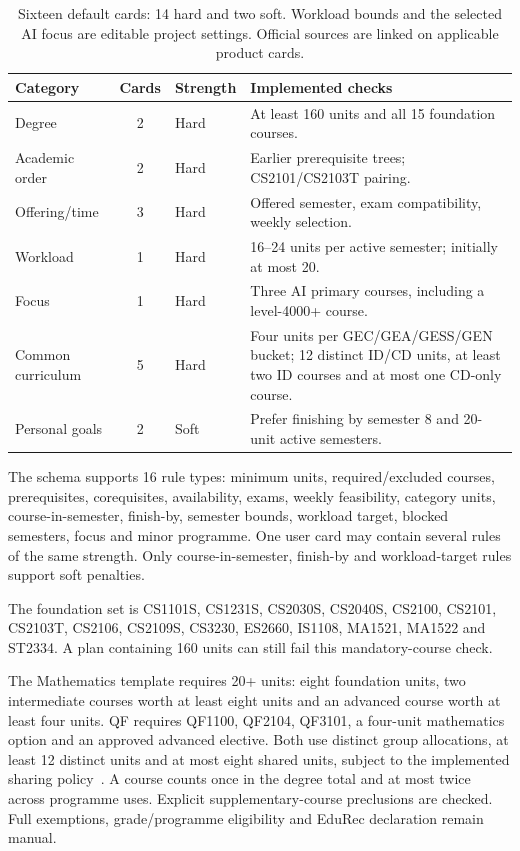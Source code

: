 \begin{table}[htbp]\centering
\begin{tabularx}{\textwidth}{@{}lclX@{}}\toprule
Category & Cards & Strength & Implemented checks\\\midrule
Degree & 2 & Hard & At least 160 units and all 15 foundation courses.\\
Academic order & 2 & Hard & Earlier prerequisite trees; CS2101/CS2103T pairing.\\
Offering/time & 3 & Hard & Offered semester, exam compatibility, weekly selection.\\
Workload & 1 & Hard & 16--24 units per active semester; initially at most 20.\\
Focus & 1 & Hard & Three AI primary courses, including a level-4000+ course.\\
Common curriculum & 5 & Hard & Four units per GEC/GEA/GESS/GEN bucket; 12 distinct ID/CD units, at least two ID courses and at most one CD-only course.\\
Personal goals & 2 & Soft & Prefer finishing by semester 8 and 20-unit active semesters.\\\bottomrule
\end{tabularx}
\caption{Sixteen default cards: 14 hard and two soft. Workload bounds and the selected AI focus are editable project settings. Official sources are linked on applicable product cards.}\label{tab:inventory}
\end{table}

The schema supports 16 rule types: minimum units, required/excluded courses, prerequisites, corequisites, availability, exams, weekly feasibility, category units, course-in-semester, finish-by, semester bounds, workload target, blocked semesters, focus and minor programme. One user card may contain several rules of the same strength. Only course-in-semester, finish-by and workload-target rules support soft penalties.

The foundation set is CS1101S, CS1231S, CS2030S, CS2040S, CS2100, CS2101, CS2103T, CS2106, CS2109S, CS3230, ES2660, IS1108, MA1521, MA1522 and ST2334. A plan containing 160 units can still fail this mandatory-course check.

The Mathematics template requires 20+ units: eight foundation units, two intermediate courses worth at least eight units and an advanced course worth at least four units. QF requires QF1100, QF2104, QF3101, a four-unit mathematics option and an approved advanced elective. Both use distinct group allocations, at least 12 distinct units and at most eight shared units, subject to the implemented sharing policy~\cite{minorsharing}. A course counts once in the degree total and at most twice across programme uses. Explicit supplementary-course preclusions are checked. Full exemptions, grade/programme eligibility and EduRec declaration remain manual.

